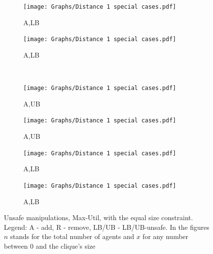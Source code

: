 \begin{figure}
\begin{subfigure}{0.07\textwidth}
        \centering
        \texttt{[image: Graphs/Distance 1 special cases.pdf]}
        \caption{A,LB}
        \label{fig:unsafeutil3}
    \end{subfigure}
    \hfill
    \begin{subfigure}{0.07\textwidth}
        \centering
        \texttt{[image: Graphs/Distance 1 special cases.pdf]}
        \caption{A,LB}
        \label{fig:unsafeutil4}
    \end{subfigure}
    \\
    \begin{subfigure}{0.07\textwidth}
        \centering
        \texttt{[image: Graphs/Distance 1 special cases.pdf]}
        \caption{A,UB}
        \label{fig:unsafeutil5}
    \end{subfigure}
    \hfill
    \begin{subfigure}{0.07\textwidth}
        \centering
        \texttt{[image: Graphs/Distance 1 special cases.pdf]}
        \caption{A,UB}
        \label{fig:unsafeutil6}
    \end{subfigure}
    \hfill
    \begin{subfigure}{0.07\textwidth}
        \centering
        \texttt{[image: Graphs/Distance 1 special cases.pdf]}
        \caption{A,LB}
        \label{fig:unsafeutil7}
    \end{subfigure}
    \hfill
    \begin{subfigure}{0.07\textwidth}
        \centering
        \texttt{[image: Graphs/Distance 1 special cases.pdf]}
        \caption{A,LB}
        \label{fig:unsafeutil8}
    \end{subfigure}
    \caption{Unsafe manipulations, Max-Util, with the equal size constraint. Legend: A - add, R - remove, LB/UB - LB/UB-unsafe. In the figures $n$ stands for the total number of agents and $x$ for any number between $0$ and the clique's size}
    \label{fig:unsafe_util_equalsize}
\end{figure}


